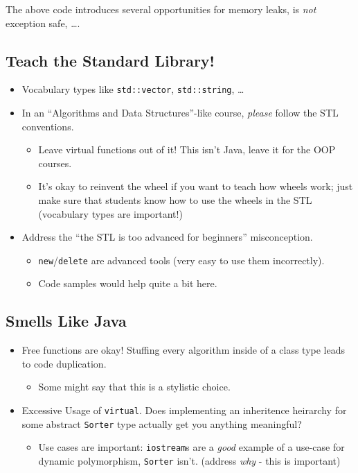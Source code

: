 \documentclass{article}
\newcommand{\CppNew}{\texttt{new}}
\newcommand{\CppDelete}{\texttt{delete}}
\newcommand{\placeholdertext}[1]{
	\noindent{\color{red}{#1}}
}
\begin{document}
The above code introduces several opportunities for memory leaks, is \emph{not} exception safe, \ldots.  








\subsection*{Teach the Standard Library!}
\placeholdertext{Address the following:}
\begin{itemize}
	\item Vocabulary types like \texttt{std::vector}, \texttt{std::string}, \ldots
	\item In an ``Algorithms and Data Structures''-like course, \emph{please} follow the STL conventions.
	\begin{itemize}
		\item Leave virtual functions out of it!  This isn't Java, leave it for the OOP courses.
		\item It's okay to reinvent the wheel if you want to teach how wheels work; just make sure that students know how to use the wheels in the STL (vocabulary types are important!)
	\end{itemize}
	\item Address the ``the STL is too advanced for beginners'' misconception.
	\begin{itemize}
		\item \CppNew{}/\CppDelete{} are advanced tools (very easy to use them incorrectly).
		\item Code samples would help quite a bit here.
	\end{itemize}
\end{itemize}



\subsection*{Smells Like Java}
\placeholdertext{Address the following:}
\begin{itemize}
	\item Free functions are okay!  Stuffing every algorithm inside of a class type leads to code duplication.
	\begin{itemize}
		\item Some might say that this is a stylistic choice.  
	\end{itemize}
	\item Excessive Usage of \texttt{virtual}.  Does implementing an inheritence heirarchy for some abstract \texttt{Sorter} type actually get you anything meaningful?
	\begin{itemize}
		\item Use cases are important:  \texttt{iostream}s are a \emph{good} example of a use-case for dynamic polymorphism, \texttt{Sorter} isn't.  (address \emph{why} - this is important)
	\end{itemize}
\end{itemize}
\end{document}
